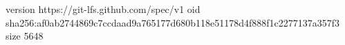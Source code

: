 version https://git-lfs.github.com/spec/v1
oid sha256:af0ab2744869c7ccdaad9a765177d680b118e51178d4f888f1c2277137a357f3
size 5648
